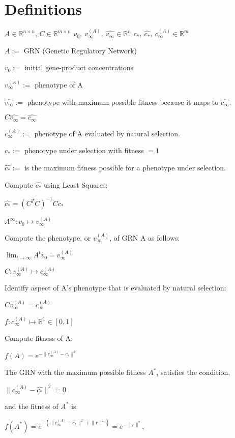 \documentclass[a4paper,12pt]{article}
\begin{document}
\section{Definitions}

$A \in \mathbb{R}^{n \times n}$,
$C \in \mathbb{R}^{m \times n}$
$v_{0}, \ v_{\infty}^{(A)}, \ \hat{v_{\infty}} \in \mathbb{R}^{n}$
$c_{*},\ \hat{c_{*}}, \ c_{\infty}^{(A)} \in \mathbb{R}^{m}$

$A :=$ GRN (Genetic Regulatory Network)

$v_{0} :=$ initial gene-product concentrations

$v_{\infty}^{(A)} :=$ phenotype of A

$\hat{v_{\infty}} :=$ phenotype with maximum possible fitness because it maps to $\hat{c_{\infty}}$. 

$C \hat{v_{\infty}} = \hat{c_{\infty}}$ 

$c_{\infty}^{(A)} :=$ phenotype of A evaluated by natural selection.

$c_{*} :=$  phenotype under selection with fitness $= 1$

$\hat{c_{*}} :=$ is the maximum fitness possible for a phenotype under selection.

Compute $\hat{c_{*}}$ using Least Squares:

$\hat{c_{*}} = (C^{T}C)^{-1}Cc_{*}$

$A^{\infty} : v_{0} \mapsto v_{\infty}^{(A)}$

Compute the phenotype, or $v_{\infty}^{(A)}$, of GRN A as follows:

$\lim_{t \to \infty}A^{t}v_{0} = v_{\infty}^{(A)}$

$C : v_{\infty}^{(A)} \mapsto c_{\infty}^{(A)}$

Identify aspect of A's phenotype that is evaluated by natural selection:

$Cv_{\infty}^{(A)} = c_{\infty}^{(A)}$ 

$f : c_{\infty}^{(A)} \mapsto \mathbb{R}^{1} \in [0,1]$

Compute fitness of A:

$f(A) = e^{-\lVert c_{\infty}^{(A)} - c_{*} \rVert^{2}}$

The GRN with the maximum possible fitness $A^{*}$, satisfies the condition,

$\lVert c_{\infty}^{(A)} - \hat{c_{*}} \rVert^{2} = 0$

and the fitness of $A^{*}$ is:

$f(A^{*}) = e^{-(\lVert c_{\infty}^{(A)} - \hat{c_{*}} \rVert^{2} + \lVert r \rVert^{2})} = e^{- \lVert r \rVert^{2}} $, 
\end{document}
